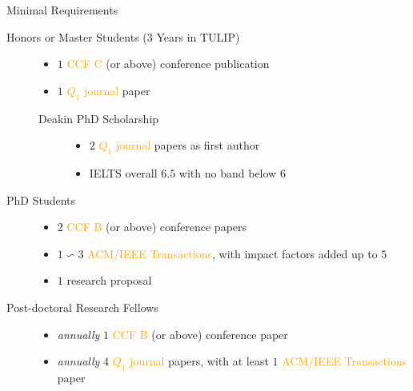 \documentclass[
 size=14pt,
 paper=smartboard,  %
 mode=present, 		%
 display=slides, 	%
 style=tuliplab,  	%
 pauseslide,
 fleqn,leqno]{powerdot}{}
\begin{document}
\begin{slide}{Minimal Requirements}
\begin{description}
\item[Honors or Master Students ($3$ Years in TULIP)]
    \begin{itemize}
        \item $1$ \textcolor{orange}{CCF C} (or above) conference publication
        \item $1$ \textcolor{orange}{$Q_1$ journal} paper
    \end{itemize}
    \begin{description}
  		\item[Deakin PhD Scholarship]
    		\begin{itemize}
        		\item $2$ \textcolor{orange}{$Q_1$ journal} papers as first author
        		\item IELTS overall $6.5$ with no band below $6$
    		\end{itemize}
	\end{description}


\item[PhD Students]
    \begin{itemize}
        \item $2$ \textcolor{orange}{CCF B} (or above) conference papers
        \item $1 \backsim 3$ \textcolor{orange}{ACM/IEEE Transactions},
        with impact factors added up to $5$
        \item $1$ research proposal
    \end{itemize}

\item[Post-doctoral Research Fellows]
    \begin{itemize}
    \item \textit{annually} $1$ \textcolor{orange}{CCF B} (or above) conference paper
    \item \textit{annually} $4$ \textcolor{orange}{$Q_1$ journal} papers,
     with at least $1$ \textcolor{orange}{ACM/IEEE Transactions} paper
    \end{itemize}

\end{description}
\end{slide}
\end{document}

